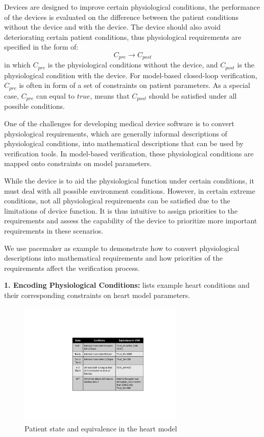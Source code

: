 Devices are designed to improve certain physiological conditions, the performance of the devices is evaluated on the difference between the patient conditions without the device and with the device. The device should also avoid deteriorating certain patient conditions, thus physiological requirements are specified in the form of:
$$C_{pre}\rightarrow C_{post}$$
in which $C_{pre}$ is the physiological conditions without the device,  and $C_{post}$ is the physiological condition with the device. For model-based closed-loop verification, $C_{pre}$ is often in form of a set of constraints on patient parameters. As a special case, $C_{pre}$ can equal to $true$, means that $C_{post}$ should be satisfied under all possible conditions.

One of the challenges for developing medical device software is to convert physiological requirements, which are generally informal descriptions of physiological conditions, into mathematical descriptions that can be used by verification tools.  In model-based verification, these physiological conditions are mapped onto constraints on model parameters. %

While the device is to aid the physiological function under certain conditions, it must deal with all possible environment conditions. However, in certain extreme conditions, not all physiological requirements can be satisfied due to the limitations of device function. It is thus intuitive to assign priorities to the requirements and assess the capability of the device to prioritize more important requirements in these scenarios. 

We use pacemaker as example to demonstrate how to convert physiological descriptions into mathematical requirements and how priorities of the requirements affect the verification process.

\noindent
\textbf{1. Encoding Physiological Conditions:}   lists example heart conditions and their corresponding constraints on heart model parameters.
\begin{figure}[!t]
	\center
	\includegraphics[width=0.70\textwidth]{figs/state.pdf}
	\center
	\vspace{-10pt}	
	\caption{Patient state and equivalence in the heart model}
	\vspace{-10pt}	
	\label{fig:state}
\end{figure}

